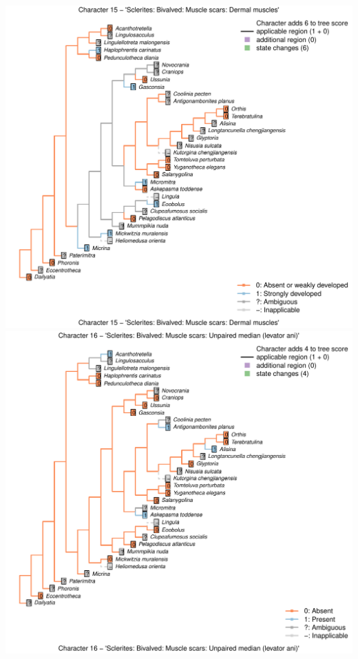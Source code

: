\documentclass[]{book}
\theoremstyle{definition}
\theoremstyle{definition}
\theoremstyle{definition}
\theoremstyle{remark}
\begin{document}
\includegraphics{Brachiopod_phylogeny_files/figure-latex/unnamed-chunk-4-15.pdf}
\includegraphics{Brachiopod_phylogeny_files/figure-latex/unnamed-chunk-4-16.pdf}
\end{document}
